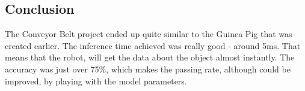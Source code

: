 \documentclass[10pt,journal,compsoc]{IEEEtran}
\begin{document}
    \subsection{Conclusion}
    The Conveyor Belt project ended up quite similar to the Guinea Pig that was created earlier. The inference time achieved was really good - around 5ms. That means that the robot, will get the data about the object almost instantly. The accuracy was just over 75\%, which makes the passing rate, although could be improved, by playing with the model parameters.
    
\end{document}
